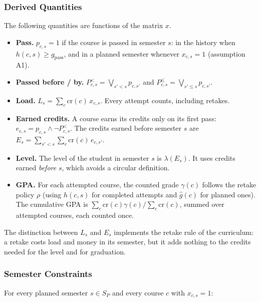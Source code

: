 \subsubsection{Derived Quantities}

The following quantities are functions of the matrix $x$.

\begin{itemize}
  \item \textbf{Pass.} $p_{c,s}=1$ if the course is passed in semester $s$:
        in the history when $h(c,s) \ge g_{\mathrm{pass}}$, and in a planned
        semester whenever $x_{c,s}=1$ (assumption A1).
  \item \textbf{Passed before / by.} $P^{<}_{c,s}=\bigvee_{s'<s} p_{c,s'}$ and
        $P^{\le}_{c,s}=\bigvee_{s'\le s} p_{c,s'}$.
  \item \textbf{Load.} $L_s=\sum_{c} \mathrm{cr}(c)\,x_{c,s}$.
        Every attempt counts, including retakes.
  \item \textbf{Earned credits.} A course earns its credits only on its
        first pass: $e_{c,s}=p_{c,s}\wedge\neg P^{<}_{c,s}$.
        The credits earned before semester $s$ are
        $E_s=\sum_{s'<s}\sum_c \mathrm{cr}(c)\,e_{c,s'}$.
  \item \textbf{Level.} The level of the student in semester $s$ is
        $\lambda(E_s)$. It uses credits earned \emph{before} $s$, which avoids
        a circular definition.
  \item \textbf{GPA.} For each attempted course, the counted grade
        $\gamma(c)$ follows the retake policy $\rho$ (using $h(c,s)$ for
        completed attempts and $\hat g(c)$ for planned ones). The cumulative GPA is
        $\sum_c \mathrm{cr}(c)\gamma(c)\big/\sum_c \mathrm{cr}(c)$, summed over attempted
        courses, each counted once.
\end{itemize}

The distinction between $L_s$ and $E_s$ implements the retake rule of the
curriculum: a retake costs load and money in its semester, but it adds
nothing to the credits needed for the level and for graduation.

\subsubsection{Semester Constraints}

For every planned semester $s \in S_P$ and every course $c$ with $x_{c,s}=1$:

